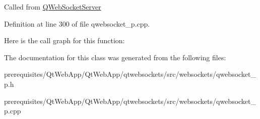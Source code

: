 Called from \mbox{\hyperlink{class_q_web_socket_server}{Q\+Web\+Socket\+Server}} 

Definition at line 300 of file qwebsocket\+\_\+p.\+cpp.

Here is the call graph for this function\+:


The documentation for this class was generated from the following files\+:\begin{DoxyCompactItemize}
\item 
prerequisites/\+Qt\+Web\+App/\+Qt\+Web\+App/qtwebsockets/src/websockets/qwebsocket\+\_\+p.\+h\item 
prerequisites/\+Qt\+Web\+App/\+Qt\+Web\+App/qtwebsockets/src/websockets/qwebsocket\+\_\+p.\+cpp\end{DoxyCompactItemize}
